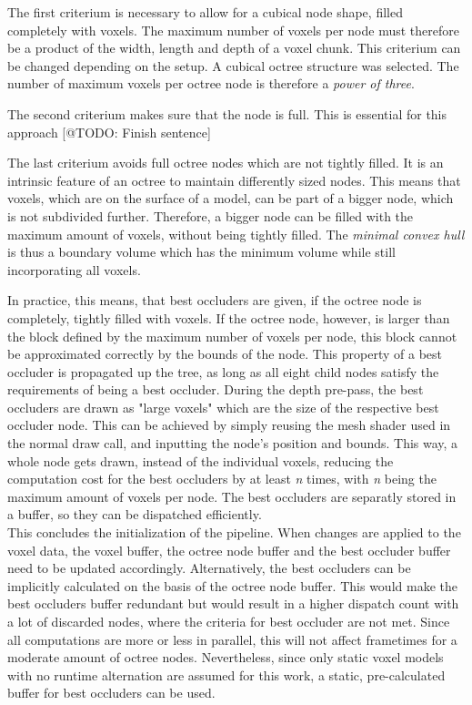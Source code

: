 The first criterium is necessary to allow for a cubical node shape, filled completely with voxels. The maximum number 
of voxels per node must therefore be a product of the width, length and depth of a voxel chunk. This criterium can 
be changed depending on the setup. A cubical octree structure was selected. The number of maximum voxels per octree node 
is therefore a \emph{power of three}.

\noindent
The second criterium makes sure that the node is full. This is essential for this approach [@TODO: Finish sentence]

\noindent
The last criterium avoids full octree nodes which are not tightly filled. It is an intrinsic feature of an octree 
to maintain differently sized nodes. This means that voxels, which are on the surface of a model, can be part of 
a bigger node, which is not subdivided further. Therefore, a bigger node can be filled with the maximum amount of 
voxels, without being tightly filled. The \emph{minimal convex hull} is thus a boundary volume which has the minimum 
volume while still incorporating all voxels.

\noindent
In practice, this means, that best occluders are given, if the octree node is completely, tightly filled 
with voxels. If the octree node, however, is larger than the block defined by the maximum number of voxels 
per node, this block cannot be approximated correctly by the bounds of the node. This property of a best 
occluder is propagated up the tree, as long as all eight child nodes satisfy the requirements of being a 
best occluder. During the depth pre-pass, the best occluders are drawn as "large voxels" which are the size 
of the respective best occluder node. This can be achieved by simply reusing the mesh shader used in the 
normal draw call, and inputting the node's position and bounds. This way, a whole node gets drawn, instead 
of the individual voxels, reducing the computation cost for the best occluders by at least \emph{n} times, 
with \emph{n} being the maximum amount of voxels per node. The best occluders are separatly stored in a 
buffer, so they can be dispatched efficiently. \\


\noindent
This concludes the initialization of the pipeline. When changes are applied to the voxel data, the voxel buffer,
the octree node buffer and the best occluder buffer need to be updated accordingly. Alternatively, the best 
occluders can be implicitly calculated on the basis of the octree node buffer. This would make the best 
occluders buffer redundant but would result in a higher dispatch count with a lot of discarded nodes, 
where the criteria for best occluder are not met. Since all computations are more or less in parallel, this 
will not affect frametimes for a moderate amount of octree nodes. Nevertheless, since only static voxel models with 
no runtime alternation are assumed for this work, a static, pre-calculated buffer for best occluders can be used.

